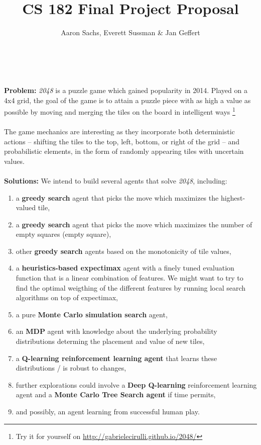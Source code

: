 \documentclass[12pt]{article}
\title{\vspace{-4cm}CS 182 Final Project Proposal}
\author{Aaron Sachs, Everett Sussman \& Jan Geffert}
\begin{document}
\maketitle
\noindent 
\\\\
\textbf{Problem: }\textit{2048} is a puzzle game which gained popularity in 2014. Played on a 4x4 grid, the goal of the game is to attain a puzzle piece with as high a value as possible by moving and merging the tiles on the board in intelligent ways \footnote{Try it for yourself on \url{http://gabrielecirulli.github.io/2048/}}
\\\\
The game mechanics are interesting as they incorporate both deterministic actions – shifting the tiles to the top, left, bottom, or right of the grid – and probabilistic elements, in the form of randomly appearing tiles with uncertain values.
\\\\
\textbf{Solutions: }We intend to build several agents that solve \textit{2048}, including:
\begin{enumerate}
\itemsep-0.2em
	\item a \textbf{greedy search} agent that picks the move which maximizes the highest-valued tile,
	\item a \textbf{greedy search} agent that picks the move which maximizes the number of empty squares (empty square),
    \item other \textbf{greedy search} agents based on the monotonicity of tile values,
	\item a \textbf{heuristics-based expectimax} agent with a finely tuned evaluation function that is a linear combination of features. We might want to try to find the optimal weigthing of the different features by running local search algorithms on top of expectimax,
	\item a pure \textbf{Monte Carlo simulation search} agent,
	\item an \textbf{MDP} agent with knowledge about the underlying probability distributions determing the placement and value of new tiles,
	\item a \textbf{Q-learning reinforcement learning agent} that learns these distributions / is robust to changes,
	\item further explorations could involve a \textbf{Deep Q-learning} reinforcement learning agent and a \textbf{Monte Carlo Tree Search agent} if time permits, 
	\item and possibly, an agent learning from successful human play.
\end{enumerate}
\end{document}
